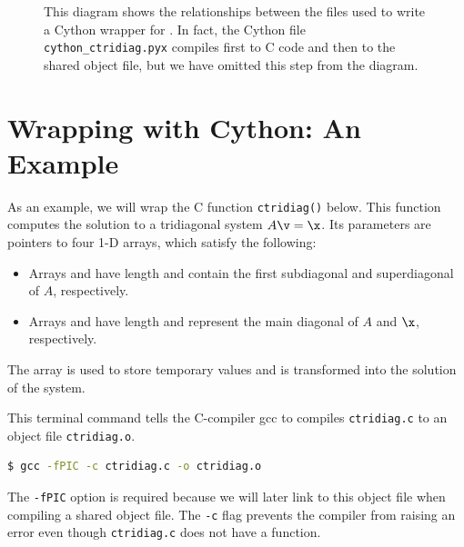 \begin{figure}
\caption{This diagram shows the relationships between the files used to write a Cython wrapper for .
In fact, the Cython file \texttt{cython\_ctridiag.pyx} compiles first to C code and then to the shared object file, but we have omitted this step from the diagram.}
\label{fig:cython_flowchart}
\end{figure}

\section*{Wrapping with Cython: An Example}
As an example, we will wrap the C function \texttt{ctridiag()} below.
This function computes the solution to a tridiagonal system $A\v = \x$.
Its parameters are pointers to four 1-D arrays, which satisfy the following:
\begin{itemize}
\item Arrays  and  have length  and contain the first subdiagonal and superdiagonal of $A$, respectively.
\item Arrays  and  have length  and represent the main diagonal of $A$ and $\x$, respectively.
\end{itemize}
The array  is used to store temporary values and  is transformed into the solution of the system.



This terminal command tells the C-compiler gcc to compiles \texttt{ctridiag.c} to an object file \texttt{ctridiag.o}.

\begin{lstlisting}[language=bash]
$ gcc -fPIC -c ctridiag.c -o ctridiag.o
\end{lstlisting}
The \texttt{-fPIC} option is required because we will later link to this object file when compiling a shared object file.
The \texttt{-c} flag prevents the compiler from raising an error even though \texttt{ctridiag.c} does not have a  function.

